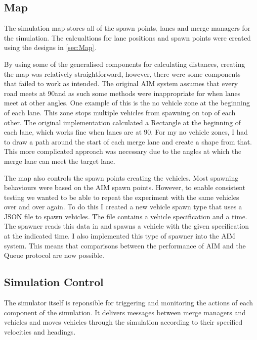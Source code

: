 \subsection{Map}
\label{subsec:Map}
The simulation map stores all of the spawn points, lanes and merge managers for the simulation. The calcualtions for lane positions and spawn points were created using the designs in \ref{sec:Map}. 

By using some of the generalised components for calculating distances, creating the map was relatively straightforward, however, there were some components that failed to work as intended. The original AIM system assumes that every road meets at 90\degree and as such some methods were inappropriate for when lanes meet at other angles. One example of this is the no vehicle zone at the beginning of each lane. This zone stops multiple vehicles from spawning on top of each other. The original implementation calculated a Rectangle at the beginning of each lane, which works fine when lanes are at 90\degree. For my no vehicle zones, I had to draw a path around the start of each merge lane and create a shape from that. This more complicated approach was necessary due to the angles at which the merge lane can meet the target lane. 

The map also controls the spawn points creating the vehicles. Most spawning behaviours were based on the AIM spawn points. However, to enable consistent testing we wanted to be able to repeat the experiment with the same vehicles over and over again. To do this I created a new vehicle spawn type that uses a JSON file to spawn vehicles. The file contains a vehicle specification and a time. The spawner reads this data in and spawns a vehicle with the given specification at the indicated time. I also implemented this type of spawner into the AIM system. This means that comparisons between the performance of AIM and the Queue protocol are now possible.

\subsection{Simulation Control}
\label{subsec:Simulation Control}
The simulator itself is reponsible for triggering and monitoring the actions of each component of the simulation. It delivers messages between merge managers and vehicles and moves vehicles through the simulation according to their specified velocities and headings.

